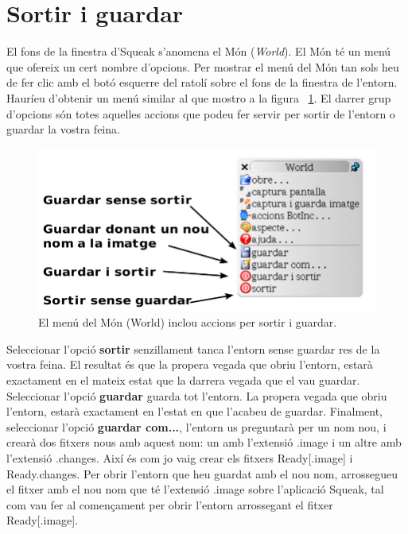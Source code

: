 \section{Sortir i guardar}
El fons de la finestra d'Squeak s'anomena el Món (\emph{World}). El Món té un menú que ofereix un cert nombre d'opcions. Per mostrar el menú del Món tan sols heu de fer clic amb el botó esquerre del ratolí sobre el fons de la finestra de l'entorn. Hauríeu d'obtenir un menú similar al que mostro a la figura 
~\ref{fig0111}. El darrer grup d'opcions són totes aquelles accions que podeu fer servir per sortir de l'entorn o guardar la vostra feina.  

\begin{figure}[h]
\begin{center}
\includegraphics[scale=0.65]{Imatges/figura1-11}
\end{center}
\caption{El menú del Món (World) inclou accions per sortir i guardar.}
\label{fig0111}
\end{figure}

Seleccionar l'opció \textbf{sortir} senzillament tanca l'entorn sense guardar res de la vostra feina. El resultat és que la propera vegada que obriu l'entorn, estarà exactament en el mateix estat que la darrera vegada que el vau guardar. Seleccionar l'opció  \textbf{guardar} guarda tot l'entorn. La propera vegada que obriu l'entorn, estarà exactament en l'estat en que l'acabeu de guardar. Finalment, seleccionar l'opció \textbf{guardar com...}, l'entorn us preguntarà per un nom nou, i crearà dos fitxers nous amb aquest nom: un amb l'extensió \textsf{.image} i un altre amb l'extensió  \textsf{.changes}. Així és com jo vaig crear els fitxers \textsf{Ready}[\textsf{.image}] i \textsf{Ready.changes}. Per obrir l'entorn que heu guardat amb el nou nom, arrossegueu el fitxer amb el nou nom que té l'extensió \textsf{.image} sobre l'aplicació \textsf{Squeak}, tal com vau fer al començament per obrir l'entorn arrossegant el fitxer \textsf{Ready}[\textsf{.image}].

